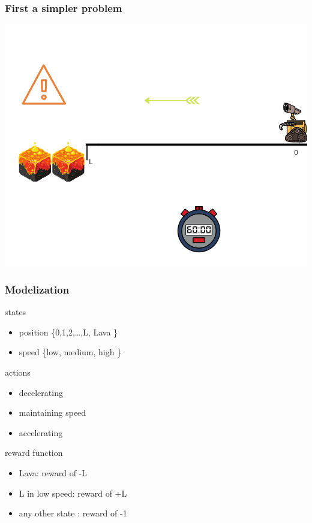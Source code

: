 \documentclass[dvipsnames,svgnames]{beamer}
\begin{document}
\begin{frame}
\frametitle{First a simpler problem}
\begin{center}
\includegraphics[scale=0.4]{img/illustration_lava.png}
\end{center}
\end{frame}

\begin{frame}
\frametitle{Modelization}
\begin{block}{states}
\begin{itemize}
\item  position \{0,1,2,\ldots ,L, Lava  \}
\item  speed    \{low, medium, high   \}
\end{itemize}
\end{block}
\pause
\begin{block}{actions}
\begin{itemize}
\item  decelerating 
\item  maintaining speed
\item  accelerating 
\end{itemize}
\end{block}
\pause
\begin{block}{reward function}
\begin{itemize}
\item Lava: reward of -L
\item L in low speed: reward of +L
\item any other state : reward of -1
\end{itemize}
\end{block}

\end{frame}
\end{document}
